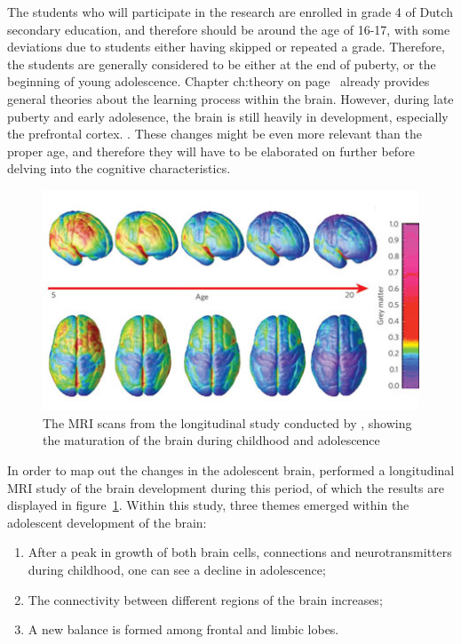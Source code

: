 The students who will participate in the research are enrolled in grade 4 of Dutch secondary education, and therefore should be around the age of 16-17, with some deviations due to students either having skipped or repeated a grade. Therefore, the students are generally considered to be either at the end of puberty, or the beginning of young adolescence. Chapter \refname{ch:theory} on page~\pageref{ch:theory} already provides general theories about the learning process within the brain. However, during late puberty and early adolesence, the brain is still heavily in development, especially the prefrontal cortex. \cite{blakemore}. These changes might be even more relevant than the proper age, and therefore they will have to be elaborated on further before delving into the cognitive characteristics.

\begin{figure}
    \centering
    \includegraphics[width=.7\textwidth]{img/braindevelopment.png}
    \caption{The MRI scans from the longitudinal study conducted by \protect{}, showing the maturation of the brain during childhood and adolescence}
    \label{fig:braindevelopment}
\end{figure}

In order to map out the changes in the adolescent brain,  performed a longitudinal MRI study of the brain development during this period, of which the results are displayed in figure~\ref{fig:braindevelopment}. Within this study, three themes emerged within the adolescent development of the brain:

\begin{enumerate}
    \item After a peak in growth of both brain cells, connections and neurotransmitters during childhood, one can see a decline in adolescence;
    \item The connectivity between different regions of the brain increases;
    \item A new balance is formed among frontal and limbic lobes.
\end{enumerate}


